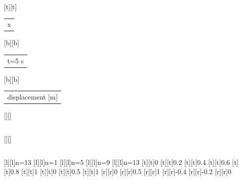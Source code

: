 %    
%
%
\begin{psfrags}%
\psfragscanon%
%
[t][t]{\color[rgb]{0,0,0}\setlength{\tabcolsep}{0pt}\begin{tabular}{c}{x}\end{tabular}}%
[b][b]{\color[rgb]{0,0,0}\setlength{\tabcolsep}{0pt}\begin{tabular}{c}t=5 s\end{tabular}}%
[b][b]{\color[rgb]{0,0,0}\setlength{\tabcolsep}{0pt}\begin{tabular}{c}displacement [m]\end{tabular}}%
[][]{\color[rgb]{0,0,0}\setlength{\tabcolsep}{0pt}\begin{tabular}{c} \end{tabular}}%
[][]{\color[rgb]{0,0,0}\setlength{\tabcolsep}{0pt}\begin{tabular}{c} \end{tabular}}%
[l][l]{\color[rgb]{0,0,0}n=13}%
[l][l]{\color[rgb]{0,0,0}n=1}%
[l][l]{\color[rgb]{0,0,0}n=5}%
[l][l]{\color[rgb]{0,0,0}n=9}%
[l][l]{\color[rgb]{0,0,0}n=13}%
%
[t][t]{0}%
[t][t]{0.2}%
[t][t]{0.4}%
[t][t]{0.6}%
[t][t]{0.8}%
[t][t]{1}%
[t][t]{0}%
[t][t]{0.5}%
[t][t]{1}%
%
[r][r]{0}%
[r][r]{0.5}%
[r][r]{1}%
[r][r]{-0.4}%
[r][r]{-0.2}%
[r][r]{0}%
%
%
\end{psfrags}%
%

